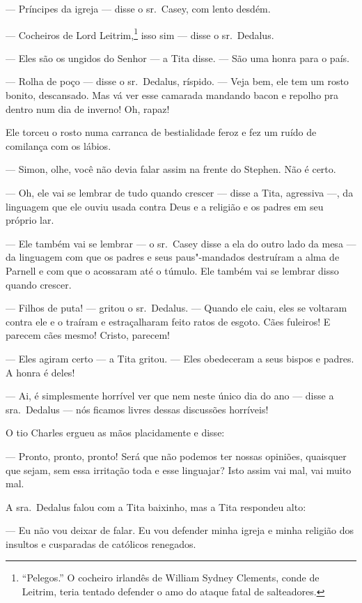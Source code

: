  --- Príncipes da igreja --- disse o sr.~Casey, com lento desdém.

 --- Cocheiros de Lord Leitrim,\footnote{ “Pelegos.” O cocheiro irlandês de
 	 William Sydney Clements, conde de Leitrim, teria tentado defender o amo
do ataque fatal de salteadores.} isso sim --- disse o sr.~Dedalus.

 --- Eles são os ungidos do Senhor --- a Tita disse. --- São uma honra para o
país.

 --- Rolha de poço --- disse o sr.~Dedalus, ríspido. --- Veja bem, 
ele tem um rosto bonito, descansado. Mas vá ver esse camarada mandando bacon e
repolho pra dentro num dia de inverno! Oh, rapaz!

Ele torceu o rosto numa carranca de bestialidade feroz e fez um ruído de
comilança com os lábios.

 --- Simon, olhe, você não devia falar assim na frente do Stephen. Não é
certo.

 --- Oh, ele vai se lembrar de tudo quando crescer --- disse a Tita, agressiva ---, da linguagem que ele ouviu usada contra Deus e a religião e os padres em seu próprio lar.

 --- Ele também vai se lembrar --- o sr.~Casey disse a ela do outro lado da mesa --- da linguagem com que os padres e seus paus"-mandados destruíram a alma de Parnell e com que o acossaram até o túmulo. Ele também vai se lembrar disso quando crescer.

 --- Filhos de puta! --- gritou o sr.~Dedalus. --- Quando ele caiu, eles se voltaram contra ele e o traíram e estraçalharam feito ratos de esgoto. Cães fuleiros! E parecem cães mesmo! Cristo, parecem!

 --- Eles agiram certo --- a Tita gritou. --- Eles obedeceram a seus bispos e padres. A honra é deles!

 --- Ai, é simplesmente horrível ver que nem neste único dia do ano --- disse a sra.~Dedalus --- nós ficamos livres dessas discussões horríveis!

O tio Charles ergueu as mãos placidamente e disse:

 --- Pronto, pronto, pronto! Será que não podemos ter nossas opiniões,
quaisquer que sejam, sem essa irritação toda e esse linguajar? Isto
assim vai mal, vai muito mal.

A sra.~Dedalus falou com a Tita baixinho, mas a Tita respondeu alto:

 --- Eu não vou deixar de falar. Eu vou defender minha igreja e minha
religião dos insultos e cusparadas de católicos renegados.

